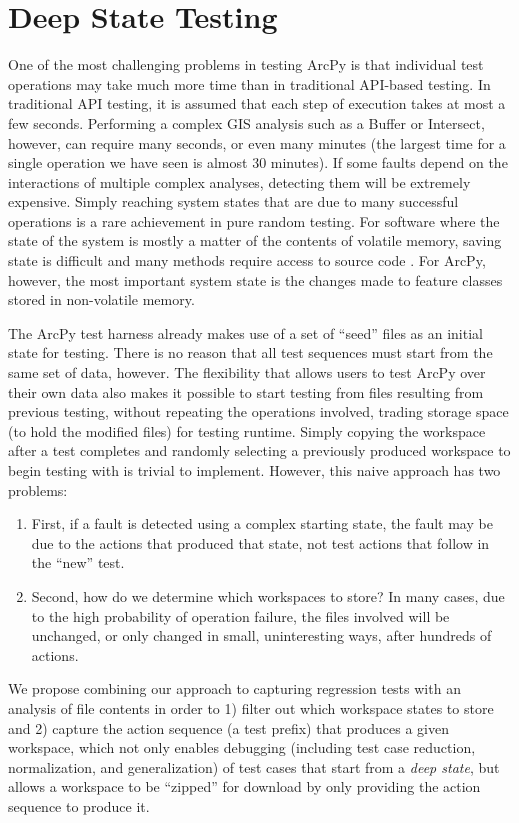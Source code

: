 \section{Deep State Testing}

One of the most challenging problems in testing ArcPy is that
individual test operations may take much more time than in traditional
API-based testing.  In traditional API testing, it is assumed that
each step of execution takes at most a few seconds.  Performing a
complex GIS analysis such as a Buffer or Intersect, however, can require
many seconds, or even many minutes (the largest time for a single
operation we have seen is almost 30 minutes).  If some faults depend
on the interactions of multiple complex analyses, detecting them will
be extremely expensive.  Simply reaching system states that are due to
many successful operations is a rare achievement in pure random
testing.  For software where the state of the system is mostly a
matter of the contents of volatile memory, saving state is difficult
and many methods require access to source code \cite{}.  For ArcPy,
however, the most important system state is the changes made to
feature classes stored in non-volatile memory.

The ArcPy test harness already makes use of a set of ``seed'' files as
an initial state for testing.  There is no reason that all test
sequences must start from the same set of data, however.  The
flexibility that allows users to test ArcPy over their own data also
makes it possible to start testing from files resulting from previous
testing, without repeating the operations involved, trading storage
space (to hold the modified files) for testing runtime.  Simply
copying the workspace after a test completes and randomly selecting a
previously produced workspace to begin testing with is trivial to
implement.  However, this naive approach has two problems:

\begin{enumerate}
\item First, if a fault is detected using a complex starting state,
  the fault may be due to the actions that produced that state, not
  test actions that follow in the ``new'' test.

\item Second, how do we determine which workspaces to store?  In many
  cases, due to the high probability of operation failure, the files
  involved will be unchanged, or only changed in small, uninteresting
  ways, after hundreds of actions.
\end{enumerate}

We propose combining our approach to capturing regression tests with an
analysis of file contents in order to 1) filter out which workspace states to
store and 2) capture the action sequence (a test prefix) that produces a given workspace,
which not only enables debugging (including test case reduction,
normalization, and generalization) of test cases that start from a
\emph{deep state}, but allows a workspace to be ``zipped'' for download by only
providing the action sequence to produce it.
